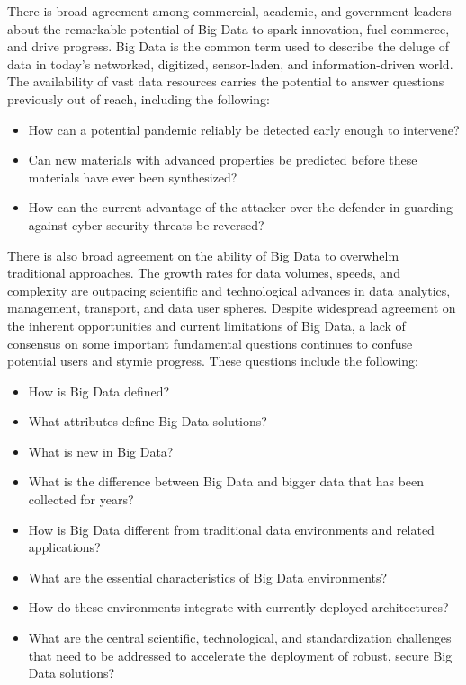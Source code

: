 

There is broad agreement among commercial, academic, and government leaders about the remarkable potential of Big Data to spark innovation, fuel commerce, and drive progress. Big Data is the common term used to describe the deluge of data in today's networked, digitized, sensor-laden, and information-driven world. The availability of vast data resources carries the potential to answer questions previously out of reach, including the following:

\begin{itemize}
\item	How can a potential pandemic reliably be detected early enough to intervene? 
\item	Can new materials with advanced properties be predicted before these materials have ever been synthesized? 
\item	How can the current advantage of the attacker over the defender in guarding against cyber-security threats be reversed? 
\end{itemize}

There is also broad agreement on the ability of Big Data to overwhelm traditional approaches. The growth rates for data volumes, speeds, and complexity are outpacing scientific and technological advances in data analytics, management, transport, and data user spheres. 
Despite widespread agreement on the inherent opportunities and current limitations of Big Data, a lack of consensus on some important fundamental questions continues to confuse potential users and stymie progress. These questions include the following: 

\begin{itemize}

\item	How is Big Data defined?

\item	What attributes define Big Data solutions? 

\item	What is new in Big Data?

\item What is the difference between Big Data and bigger data that has
been collected for years?

\item	How is Big Data different from traditional data environments and related applications? 

\item	What are the essential characteristics of Big Data environments? 

\item	How do these environments integrate with currently deployed architectures? 

\item What are the central scientific, technological, and
standardization challenges that need to be addressed to accelerate the
deployment of robust, secure Big Data solutions?

\end{itemize}

